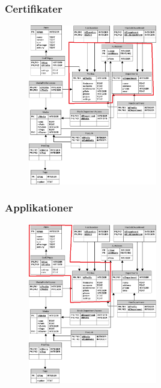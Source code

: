 \documentclass{beamer}
\begin{document}
\begin{frame}
	\frametitle{Certifikater}
	
	\begin{figure}[!h]
		\centering
			\includegraphics[width=0.5\textwidth]{dbCertificate}
		\label{fig:Certifikater}
	\end{figure}
\end{frame}

\begin{frame}
	\frametitle{Applikationer}
	
	\begin{figure}[!h]
		\centering
			\includegraphics[width=0.5\textwidth]{dbApps}
		\label{fig:Applikationer}
	\end{figure}
\end{frame}
\end{document}
